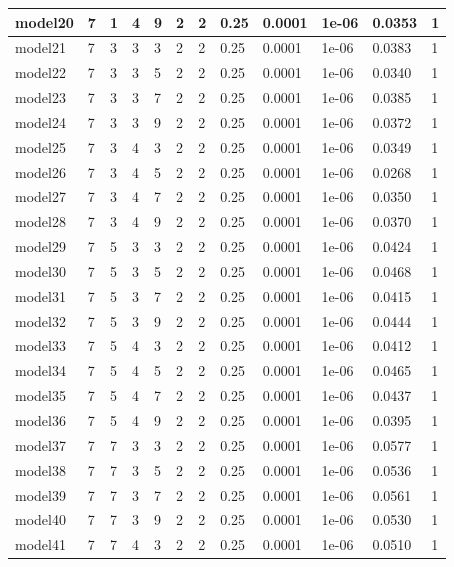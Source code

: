 \documentclass[12pt, twoside]{article}
\begin{document}
\begin{appendices}
\begin{longtable} {|l|l|l|l|l|l|l|l|l|l|l|l|}
		model20 & 7 & 1 & 4 & 9 & 2 & 2 & 0.25 & 0.0001 & 1e-06 & 0.0353 & 1\\ \hline
		model21 & 7 & 3 & 3 & 3 & 2 & 2 & 0.25 & 0.0001 & 1e-06 & 0.0383 & 1\\ \hline
		model22 & 7 & 3 & 3 & 5 & 2 & 2 & 0.25 & 0.0001 & 1e-06 & 0.0340 & 1\\ \hline
		model23 & 7 & 3 & 3 & 7 & 2 & 2 & 0.25 & 0.0001 & 1e-06 & 0.0385 & 1\\ \hline
		model24 & 7 & 3 & 3 & 9 & 2 & 2 & 0.25 & 0.0001 & 1e-06 & 0.0372 & 1\\ \hline
		model25 & 7 & 3 & 4 & 3 & 2 & 2 & 0.25 & 0.0001 & 1e-06 & 0.0349 & 1\\ \hline
		model26 & 7 & 3 & 4 & 5 & 2 & 2 & 0.25 & 0.0001 & 1e-06 & 0.0268 & 1\\ \hline
		model27 & 7 & 3 & 4 & 7 & 2 & 2 & 0.25 & 0.0001 & 1e-06 & 0.0350 & 1\\ \hline
		model28 & 7 & 3 & 4 & 9 & 2 & 2 & 0.25 & 0.0001 & 1e-06 & 0.0370 & 1\\ \hline
		model29 & 7 & 5 & 3 & 3 & 2 & 2 & 0.25 & 0.0001 & 1e-06 & 0.0424 & 1\\ \hline
		model30 & 7 & 5 & 3 & 5 & 2 & 2 & 0.25 & 0.0001 & 1e-06 & 0.0468 & 1\\ \hline
		model31 & 7 & 5 & 3 & 7 & 2 & 2 & 0.25 & 0.0001 & 1e-06 & 0.0415 & 1\\ \hline
		model32 & 7 & 5 & 3 & 9 & 2 & 2 & 0.25 & 0.0001 & 1e-06 & 0.0444 & 1\\ \hline
		model33 & 7 & 5 & 4 & 3 & 2 & 2 & 0.25 & 0.0001 & 1e-06 & 0.0412 & 1\\ \hline
		model34 & 7 & 5 & 4 & 5 & 2 & 2 & 0.25 & 0.0001 & 1e-06 & 0.0465 & 1\\ \hline
		model35 & 7 & 5 & 4 & 7 & 2 & 2 & 0.25 & 0.0001 & 1e-06 & 0.0437 & 1\\ \hline
		model36 & 7 & 5 & 4 & 9 & 2 & 2 & 0.25 & 0.0001 & 1e-06 & 0.0395 & 1\\ \hline
		model37 & 7 & 7 & 3 & 3 & 2 & 2 & 0.25 & 0.0001 & 1e-06 & 0.0577 & 1\\ \hline
		model38 & 7 & 7 & 3 & 5 & 2 & 2 & 0.25 & 0.0001 & 1e-06 & 0.0536 & 1\\ \hline
		model39 & 7 & 7 & 3 & 7 & 2 & 2 & 0.25 & 0.0001 & 1e-06 & 0.0561 & 1\\ \hline
		model40 & 7 & 7 & 3 & 9 & 2 & 2 & 0.25 & 0.0001 & 1e-06 & 0.0530 & 1\\ \hline
		model41 & 7 & 7 & 4 & 3 & 2 & 2 & 0.25 & 0.0001 & 1e-06 & 0.0510 & 1\\ \hline

\end{longtable}
\end{appendices}
\end{document}
